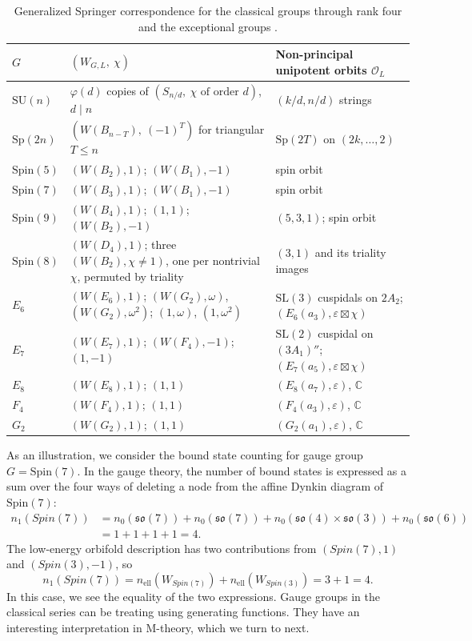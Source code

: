 \documentclass[12pt]{article}
\numberwithin{equation}{section}%
\theoremstyle{definition}
\newcommand{\cO}{\mathcal{O}}
\newcommand{\SL}{\mathrm{SL}}
\newcommand{\SU}{\mathrm{SU}}
\newcommand{\Sp}{\mathrm{Sp}}
\newcommand{\Spin}{\mathrm{Spin}}
\newcommand{\bC}{\mathbb{C}}
\newcommand{\fso}{\mathfrak{so}}
\DeclareMathOperator{\elliptic}{ell}
\begin{document}
\begin{table}[htbp]
\centering
\small
\setlength{\tabcolsep}{4pt}
\begin{tabular}{l>{\raggedright\arraybackslash}p{}>{\raggedright\arraybackslash}p{}}
\toprule
$G$ & $(W_{G,L},\ \chi)$ & Non-principal unipotent orbits $\cO_L$  \\
\midrule
$\SU(n)$ & $\varphi(d)$ copies of $(S_{n/d},\ \chi\text{ of order }d)$,
  $d\mid n$ & $(k/d,n/d)$ strings\\
$\Sp(2n)$ & $(W(B_{n-T}),\ (-1)^{T})$ for triangular $T\le n$
  & $\Sp(2T)$ on $(2k,\dots,2)$\\
$\Spin(5)$ & $(W(B_2),1)$; $(W(B_1),-1)$ & spin orbit\\
$\Spin(7)$ & $(W(B_3),1)$; $(W(B_1),-1)$ & spin orbit\\
$\Spin(9)$ & $(W(B_4),1)$; $(1,1)$; $(W(B_2),-1)$ &
  $(5,3,1)$; spin orbit\\
$\Spin(8)$ & $(W(D_4),1)$; three $(W(B_2),\chi\neq1)$, one per nontrivial
$\chi$, permuted by triality &
$(3,1)$ and its triality images\\
$E_6$ & $(W(E_6),1)$; $(W(G_2),\omega)$, $(W(G_2),\omega^2)$;
$(1,\omega)$, $(1,\omega^2)$ &
$\SL(3)$ cuspidals on $2A_2$; $(E_6(a_3),\varepsilon\boxtimes\chi)$\\
$E_7$ & $(W(E_7),1)$; $(W(F_4),-1)$; $(1,-1)$ &
$\SL(2)$ cuspidal on $(3A_1)''$; $(E_7(a_5),\varepsilon\boxtimes\chi)$\\
$E_8$ & $(W(E_8),1)$; $(1,1)$ & $(E_8(a_7),\varepsilon)$, $\bC$ \\
$F_4$ & $(W(F_4),1)$; $(1,1)$ & $(F_4(a_3),\varepsilon)$, $\bC$ \\
$G_2$ & $(W(G_2),1)$; $(1,1)$ & $(G_2(a_1),\varepsilon)$, $\bC$ \\
\bottomrule
\end{tabular}
\caption{Generalized Springer correspondence for the
classical groups through rank four and the exceptional groups \cite{MR732546,  MR1021493, MR3694647}.}
\label{tab:relativeweyl}
\end{table}
As an illustration, we consider the bound state counting for gauge group $G = \Spin(7)$.  In the gauge theory, the number of bound states is expressed as a sum over the four ways of deleting a node from the affine Dynkin diagram of $\Spin(7)$:
\begin{align*}
n_1(Spin(7)) & = n_0(\fso(7)) + n_0(\fso(7)) + n_0(\fso(4) \times \fso(3)) + n_0(\fso(6)) \\
& = 1 + 1 + 1 + 1 = 4.
\end{align*}
The low-energy orbifold description has two contributions from $(Spin(7), 1)$ and $(Spin(3), -1)$, so 
\begin{equation*}
n_1(Spin(7)) = n_{\elliptic}(W_{Spin(7)}) +  n_{\elliptic}(W_{Spin(3)}) = 3 + 1 = 4. 
\end{equation*}
In this case, we see the equality of the two expressions.  Gauge groups in the classical series can be treating using generating functions.  They have an interesting interpretation in M-theory, which we turn to next.
\end{document}
